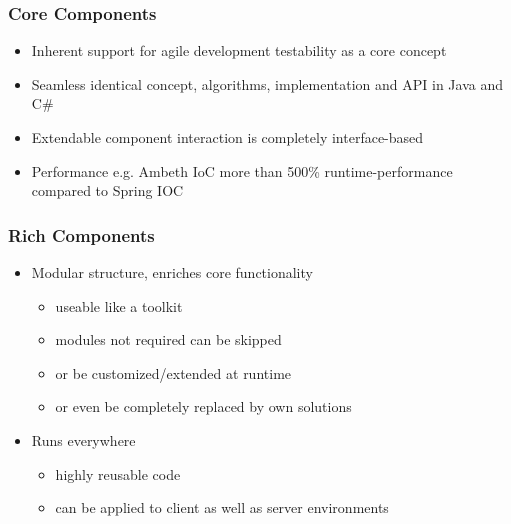 \subsubsection{Core Components}
\begin{itemize}
	\item Inherent support for agile development \newline testability as a core concept
	\item Seamless \newline identical concept, algorithms, implementation and API in Java and C\#
	\item Extendable \newline component interaction is completely interface-based
	\item Performance \newline e.g. Ambeth IoC more than 500\% runtime-performance compared to Spring IOC
\end{itemize}

\subsubsection{Rich Components}
\begin{itemize}
	\item Modular structure, enriches core functionality
	\begin{itemize}
		\item useable like a toolkit
		\item modules not required can be skipped
		\item or be customized/extended at runtime
		\item or even be completely replaced by own solutions
	\end{itemize}
	\item Runs everywhere
	\begin{itemize}
		\item highly reusable code
		\item can be applied to client as well as server environments
	\end{itemize}
\end{itemize}


